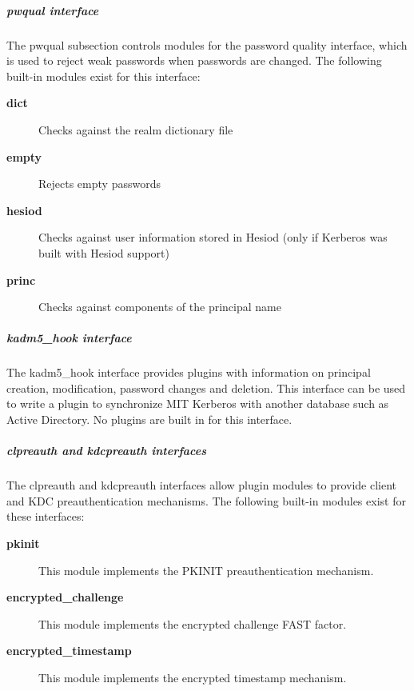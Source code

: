 \documentclass[letterpaper,10pt,english]{sphinxmanual}
\begin{document}
\subparagraph{pwqual interface}
\label{admin/conf_files/krb5_conf:pwqual-interface}\label{admin/conf_files/krb5_conf:pwqual}
The pwqual subsection controls modules for the password quality
interface, which is used to reject weak passwords when passwords are
changed.  The following built-in modules exist for this interface:
\begin{description}
\item[{\textbf{dict}}] \leavevmode
Checks against the realm dictionary file

\item[{\textbf{empty}}] \leavevmode
Rejects empty passwords

\item[{\textbf{hesiod}}] \leavevmode
Checks against user information stored in Hesiod (only if Kerberos
was built with Hesiod support)

\item[{\textbf{princ}}] \leavevmode
Checks against components of the principal name

\end{description}


\subparagraph{kadm5\_hook interface}
\label{admin/conf_files/krb5_conf:kadm5-hook-interface}\label{admin/conf_files/krb5_conf:kadm5-hook}
The kadm5\_hook interface provides plugins with information on
principal creation, modification, password changes and deletion.  This
interface can be used to write a plugin to synchronize MIT Kerberos
with another database such as Active Directory.  No plugins are built
in for this interface.
\label{admin/conf_files/krb5_conf:clpreauth}

\subparagraph{clpreauth and kdcpreauth interfaces}
\label{admin/conf_files/krb5_conf:clpreauth-and-kdcpreauth-interfaces}\label{admin/conf_files/krb5_conf:clpreauth}\label{admin/conf_files/krb5_conf:kdcpreauth}
The clpreauth and kdcpreauth interfaces allow plugin modules to
provide client and KDC preauthentication mechanisms.  The following
built-in modules exist for these interfaces:
\begin{description}
\item[{\textbf{pkinit}}] \leavevmode
This module implements the PKINIT preauthentication mechanism.

\item[{\textbf{encrypted\_challenge}}] \leavevmode
This module implements the encrypted challenge FAST factor.

\item[{\textbf{encrypted\_timestamp}}] \leavevmode
This module implements the encrypted timestamp mechanism.

\end{description}
\end{document}
